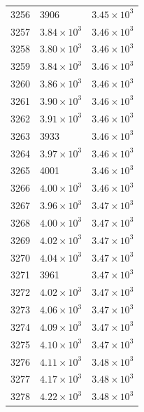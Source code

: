 \begin{table}[H]
\begin{tabular}{lll}
3256 & 3906 & $\displaystyle 3.45 \times 10^{3}$ \\
3257 & $\displaystyle 3.84 \times 10^{3}$ & $\displaystyle 3.46 \times 10^{3}$ \\
3258 & $\displaystyle 3.80 \times 10^{3}$ & $\displaystyle 3.46 \times 10^{3}$ \\
3259 & $\displaystyle 3.84 \times 10^{3}$ & $\displaystyle 3.46 \times 10^{3}$ \\
3260 & $\displaystyle 3.86 \times 10^{3}$ & $\displaystyle 3.46 \times 10^{3}$ \\
3261 & $\displaystyle 3.90 \times 10^{3}$ & $\displaystyle 3.46 \times 10^{3}$ \\
3262 & $\displaystyle 3.91 \times 10^{3}$ & $\displaystyle 3.46 \times 10^{3}$ \\
3263 & 3933 & $\displaystyle 3.46 \times 10^{3}$ \\
3264 & $\displaystyle 3.97 \times 10^{3}$ & $\displaystyle 3.46 \times 10^{3}$ \\
3265 & 4001 & $\displaystyle 3.46 \times 10^{3}$ \\
3266 & $\displaystyle 4.00 \times 10^{3}$ & $\displaystyle 3.46 \times 10^{3}$ \\
3267 & $\displaystyle 3.96 \times 10^{3}$ & $\displaystyle 3.47 \times 10^{3}$ \\
3268 & $\displaystyle 4.00 \times 10^{3}$ & $\displaystyle 3.47 \times 10^{3}$ \\
3269 & $\displaystyle 4.02 \times 10^{3}$ & $\displaystyle 3.47 \times 10^{3}$ \\
3270 & $\displaystyle 4.04 \times 10^{3}$ & $\displaystyle 3.47 \times 10^{3}$ \\
3271 & 3961 & $\displaystyle 3.47 \times 10^{3}$ \\
3272 & $\displaystyle 4.02 \times 10^{3}$ & $\displaystyle 3.47 \times 10^{3}$ \\
3273 & $\displaystyle 4.06 \times 10^{3}$ & $\displaystyle 3.47 \times 10^{3}$ \\
3274 & $\displaystyle 4.09 \times 10^{3}$ & $\displaystyle 3.47 \times 10^{3}$ \\
3275 & $\displaystyle 4.10 \times 10^{3}$ & $\displaystyle 3.47 \times 10^{3}$ \\
3276 & $\displaystyle 4.11 \times 10^{3}$ & $\displaystyle 3.48 \times 10^{3}$ \\
3277 & $\displaystyle 4.17 \times 10^{3}$ & $\displaystyle 3.48 \times 10^{3}$ \\
3278 & $\displaystyle 4.22 \times 10^{3}$ & $\displaystyle 3.48 \times 10^{3}$ \\

\end{tabular}
\end{table}
